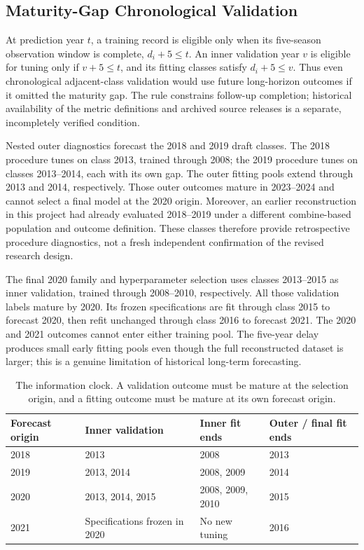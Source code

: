 \documentclass[11pt]{article}
\begin{document}
\subsection{Maturity-Gap Chronological Validation}
At prediction year $t$, a training record is eligible only when its five-season observation window is complete, $d_i+5\leq t$. An inner validation year $v$ is eligible for tuning only if $v+5\leq t$, and its fitting classes satisfy $d_i+5\leq v$. Thus even chronological adjacent-class validation would use future long-horizon outcomes if it omitted the maturity gap. The rule constrains follow-up completion; historical availability of the metric definitions and archived source releases is a separate, incompletely verified condition.

Nested outer diagnostics forecast the 2018 and 2019 draft classes. The 2018 procedure tunes on class 2013, trained through 2008; the 2019 procedure tunes on classes 2013--2014, each with its own gap. The outer fitting pools extend through 2013 and 2014, respectively. Those outer outcomes mature in 2023--2024 and cannot select a final model at the 2020 origin. Moreover, an earlier reconstruction in this project had already evaluated 2018--2019 under a different combine-based population and outcome definition. These classes therefore provide retrospective procedure diagnostics, not a fresh independent confirmation of the revised research design.

The final 2020 family and hyperparameter selection uses classes 2013--2015 as inner validation, trained through 2008--2010, respectively. All those validation labels mature by 2020. Its frozen specifications are fit through class 2015 to forecast 2020, then refit unchanged through class 2016 to forecast 2021. The 2020 and 2021 outcomes cannot enter either training pool. The five-year delay produces small early fitting pools even though the full reconstructed dataset is larger; this is a genuine limitation of historical long-term forecasting.

\begin{table}[htbp]
\centering\small
\begin{tabular}{llll}
\toprule
Forecast origin & Inner validation & Inner fit ends & Outer / final fit ends\\
\midrule
2018 & 2013 & 2008 & 2013\\
2019 & 2013, 2014 & 2008, 2009 & 2014\\
2020 & 2013, 2014, 2015 & 2008, 2009, 2010 & 2015\\
2021 & Specifications frozen in 2020 & No new tuning & 2016\\
\bottomrule
\end{tabular}
\caption{The information clock. A validation outcome must be mature at the selection origin, and a fitting outcome must be mature at its own forecast origin.}
\end{table}
\end{document}
